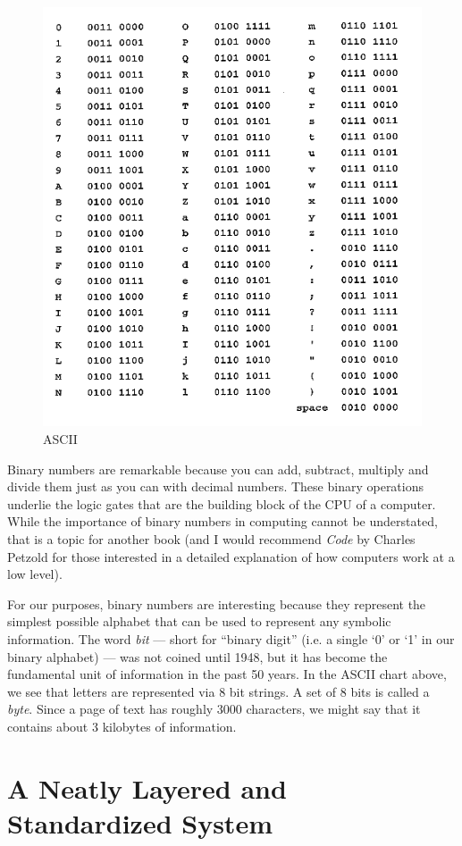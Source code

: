 \documentclass[UTF8]{book}
\begin{document}
\begin{CJK}{UTF8}{gbsn}
\begin{figure}[H]
\centering
\includegraphics[width=0.8\linewidth]{ascii-binary-chart}
\caption{ASCII}
\end{figure}

Binary numbers are remarkable because you can add, subtract, multiply and divide them just as you can with decimal numbers. These binary operations underlie the logic gates that are the building block of the CPU of a computer. While the importance of binary numbers in computing cannot be understated, that is a topic for another book (and I would recommend \emph{Code} by Charles Petzold for those interested in a detailed explanation of how computers work at a low level).

For our purposes, binary numbers are interesting because they represent the simplest possible alphabet that can be used to represent any symbolic information. The word \emph{bit} --- short for ``binary digit'' (i.e. a single `0' or `1' in our binary alphabet) --- was not coined until 1948, but it has become the fundamental unit of information in the past 50 years. In the ASCII chart above, we see that letters are represented via 8 bit strings. A set of 8 bits is called a \emph{byte}. Since a page of text has roughly 3000 characters, we might say that it contains about 3 kilobytes of information.

\section{A Neatly Layered and Standardized System}


\end{CJK}
\end{document}

